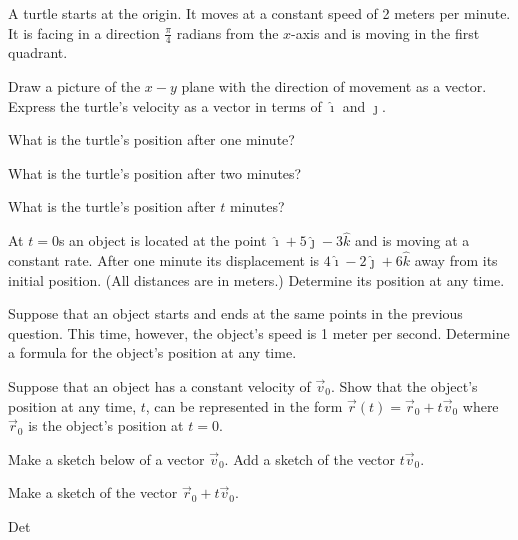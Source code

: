 \begin{problem}

  \item A turtle starts at the origin. It moves at a constant speed of 2
    meters per minute. It is facing in a direction $\frac{\pi}{4}$
    radians from the $x$-axis and is moving in the first quadrant.
    \begin{subproblem}
      \item Draw a picture of the $x-y$ plane with the direction of movement as a vector.
         Express the turtle's velocity as a vector in terms of $\hat{\imath}$ and $\hat{\jmath}$.
        \vfill
      \item What is the turtle's position after one minute?
        \vfill
      \item What is the turtle's position after two minutes?
        \vfill
      \item What is the turtle's position after $t$ minutes?
        \vfill
    \end{subproblem}
    \vfill

  \clearpage

  \item At $t=0$s an object is located at the point $\hat{\imath}+5\hat{\jmath}-3\hat{k}$  and is
  moving at a constant rate. After one minute its displacement is $4\hat{\imath}-2\hat{\jmath}+6\hat{k}$
  away from its initial position. (All distances are in meters.)
  Determine its position at any time.

    \vfill

  \item Suppose that an object starts and ends at the same points in the previous question. This time, however, the object's speed is 1 meter per second. 
    Determine a formula for the object's position at any time.

  \vfill

  \clearpage

  \item Suppose that an object has a constant velocity of $\vec{v}_0$. Show that the object's position at any time, $t$, can be represented in the form $\vec{r}(t) = \vec{r}_0 + t \vec{v}_0$ 
    where $\vec{r}_0$ is the object's position at $t=0$.
    \vfill

  \item Make a sketch below of a vector $\vec{v}_0$. Add a sketch of the vector $t\vec{v}_0$. 
    \vfill
    
  \item Make a sketch of the vector $\vec{r}_0 + t  \vec{v}_0$.
  \vfill
  
  \item Det

\end{problem}


